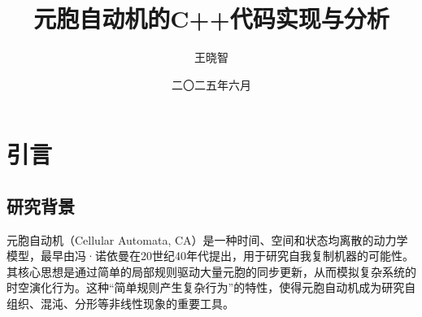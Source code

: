 \documentclass[forprint]{WHUBachelor}
\begin{document}


\title{元胞自动机的C++代码实现与分析} %
\author{王晓智} %
\date{二〇二五年六月} %


\maketitle
\frontmatter
{}              %


\tableofcontents
\thispagestyle{empty}				%




\mainmatter %
\pagestyle{plain}%
\baselineskip=23pt  %



\chapter{引言}
 
 \section{研究背景}

元胞自动机（Cellular Automata, CA）是一种时间、空间和状态均离散的动力学模型，最早由冯·诺依曼在20世纪40年代提出，用于研究自我复制机器的可能性。其核心思想是通过简单的局部规则驱动大量元胞的同步更新，从而模拟复杂系统的时空演化行为。这种“简单规则产生复杂行为”的特性，使得元胞自动机成为研究自组织、混沌、分形等非线性现象的重要工具。
\end{document}
